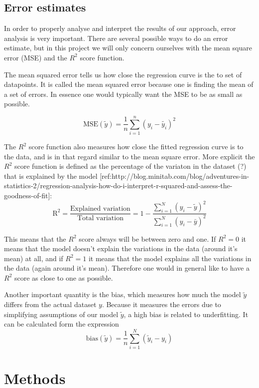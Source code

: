 \documentclass[a4paper,12pt]{article}
\begin{document}
\subsection{Error estimates}
In order to properly analyse and interpret the results of our approach, error analysis is very important. There are several possible ways to do an error estimate, but in this project we will only concern ourselves with the mean square error (MSE) and the $R^2$ score function.\newline

The mean squared error tells us how close the regression curve is the to set of datapoints. It is called the mean squared error because one is finding the mean of a set of errors. In essence one would typically want the MSE to be as small as possible.

\begin{equation}
\text{MSE}(\tilde{y})=\frac{1}{n}\sum_{i=1}^n(y_i-\tilde{y_i})^2
\end{equation}

The $R^2$ score function also measures how close the fitted regression curve is to the data, and is in that regard similar to the mean square error. More explicit the $R^2$ score function is defined as the percentage of the variaton in the dataset (?) that is explained by the model [ref:http://blog.minitab.com/blog/adventures-in-statistics-2/regression-analysis-how-do-i-interpret-r-squared-and-assess-the-goodness-of-fit]:
\begin{equation}
\text{R}^2=\frac{\text{Explained variation}}{\text{Total variation}} = 1-\frac{\sum_{i=1}^N(y_i-\tilde{y})^2}{\sum_{i=1}^N(y_i-\bar{y})^2}
\end{equation}

This means that the $R^2$ score always will be between zero and one. If $R^2 = 0$ it means that the model doesn't explain the variations in the data (around it's mean) at all, and if $R^2 = 1$ it means that the model explains all the variations in the data (again around it's mean). Therefore one would in general like to have a $R^2$ score as close to one as possible.\newline

Another important quantity is the bias, which measures how much the model $\tilde{y}$ differs from the actual dataset $y$. Because it measures the errors due to simplifying assumptions of our model $\tilde{y}$, a high bias is related to underfitting.  It can be calculated form the expression
\begin{equation}
\text{bias}(\tilde{y})=\frac{1}{n}\sum_{i=1}^N(\tilde{y}_i - y_i)
\end{equation}


\section{Methods}
\end{document}
